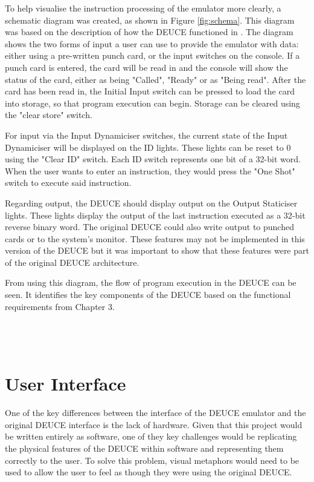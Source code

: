 \documentclass{l4proj}
\begin{document}
To help visualise the instruction processing of the emulator more clearly, a schematic diagram was created, as shown in Figure \ref{fig:schema}. This diagram was based on the description of how the DEUCE functioned in \citet{Vowels05}. The diagram shows the two forms of input a user can use to provide the emulator with data: either using a pre-written punch card, or the input switches on the console. If a punch card is entered, the card will be read in and the console will show the status of the card, either as being "Called", "Ready" or as "Being read". After the card has been read in, the Initial Input switch can be pressed to load the card into storage, so that program execution can begin. Storage can be cleared using the "clear store" switch.
	
For input via the Input Dynamiciser switches, the current state of the Input Dynamiciser will be displayed on the ID lights. These lights can be reset to 0 using the "Clear ID" switch. Each ID switch represents one bit of a 32-bit word. When the user wants to enter an instruction, they would press the "One Shot" switch to execute said instruction.
	
Regarding output, the DEUCE should display output on the Output Staticiser lights. These lights display the output of the last instruction executed as a 32-bit reverse binary word. The original DEUCE could also write output to punched cards or to the system's monitor. These features may not be implemented in this version of the DEUCE but it was important to show that these features were part of the original DEUCE architecture.

From using this diagram, the flow of program execution in the DEUCE can be seen. It identifies the key components of the DEUCE based on the functional requirements from Chapter 3. \\ \\ \\ \\
	
\section{User Interface}
One of the key differences between the interface of the DEUCE emulator and the original DEUCE interface is the lack of hardware. Given that this project would be written entirely as software, one of they key challenges would be replicating the physical features of the DEUCE within software and representing them correctly to the user. To solve this problem, visual metaphors would need to be used to allow the user to feel as though they were using the original DEUCE.
	
\end{document}
